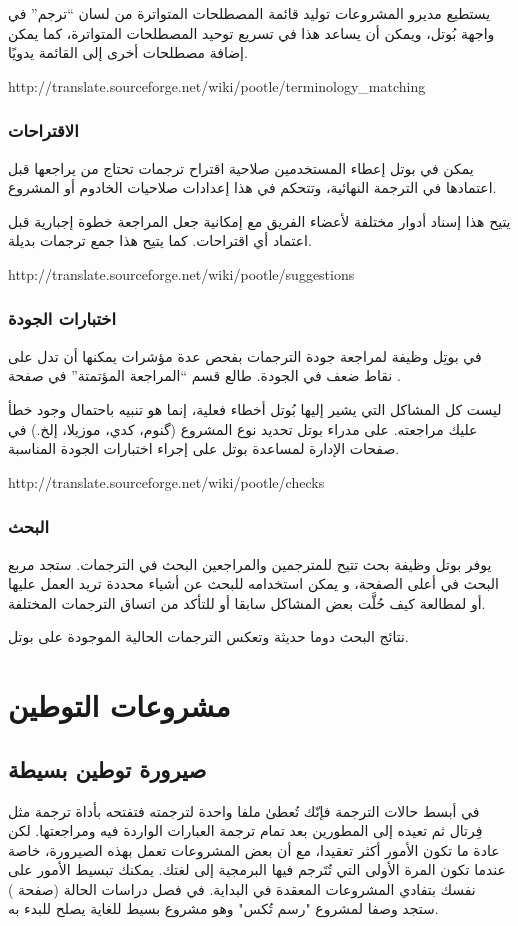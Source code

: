 يستطيع مديرو المشروعات توليد قائمة المصطلحات المتواترة من لسان “ترجم” في
واجهة بُوتل، ويمكن أن يساعد هذا في تسريع توحيد المصطلحات المتواترة، كما
يمكن إضافة مصطلحات أخرى إلى القائمة يدويًا.

http://translate.sourceforge.net/wiki/pootle/terminology\_matching

\subsection{الاقتراحات}
يمكن في بوتل إعطاء المستخدمين صلاحية اقتراح ترجمات تحتاج من يراجعها قبل
اعتمادها في الترجمة النهائية، وتتحكم في هذا إعدادات صلاحيات الخادوم أو
المشروع.

يتيح هذا إسناد أدوار مختلفة لأعضاء الفريق مع إمكانية جعل المراجعة خطوة
إجبارية قبل اعتماد أي اقتراحات. كما يتيح هذا جمع ترجمات بديلة.

http://translate.sourceforge.net/wiki/pootle/suggestions

\subsection{اختبارات الجودة}
في بوتِل وظيفة لمراجعة جودة الترجمات بفحص عدة مؤشرات يمكنها أن تدل على
نقاط ضعف في الجودة. طالع قسم “المراجعة المؤتمتة” في صفحة
\at[ref:36134309].

ليست كل المشاكل التي يشير إليها بُوتل أخطاء فعلية، إنما هو تنبيه باحتمال
وجود خطأ عليك مراجعته. على مدراء بوتل تحديد نوع المشروع (گنوم، كدي،
موزيلا، إلخ.) في صفحات الإدارة لمساعدة بوتل على إجراء اختبارات الجودة
المناسبة.

http://translate.sourceforge.net/wiki/pootle/checks

\subsection{البحث}
يوفر بوتل وظيفة بحث تتيح للمترجمين والمراجعين البحث في الترجمات. ستجد
مربع البحث في أعلى الصفحة، و يمكن استخدامه للبحث عن أشياء محددة تريد
العمل عليها أو لمطالعة كيف حُلَّت بعض المشاكل سابقا أو للتأكد من اتساق
الترجمات المختلفة.

نتائج البحث دوما حديثة وتعكس الترجمات الحالية الموجودة على بوتل.

\chapter{مشروعات التوطين}
\section[ref:38565525]{صيرورة توطين بسيطة}
في أبسط حالات الترجمة فإنّك تُعطىٰ
ملفا واحدة لترجمته فتفتحه بأداة ترجمة مثل فِرتال ثم تعيده إلى المطورين
بعد تمام ترجمة العبارات الواردة فيه ومراجعتها. لكن عادة ما تكون الأمور
أكثر تعقيدا، مع أن بعض المشروعات تعمل بهذه الصيرورة، خاصة عندما تكون
المرة الأولى التي تُتَرجم فيها البرمجية إلى لغتك. يمكنك تبسيط الأمور
على نفسك بتفادي المشروعات المعقدة في البداية. في فصل دراسات الحالة
(صفحة \at[ref:34376426]) ستجد وصفا لمشروع "رسم تُكس" وهو
مشروع بسيط للغاية يصلح للبدء به.

